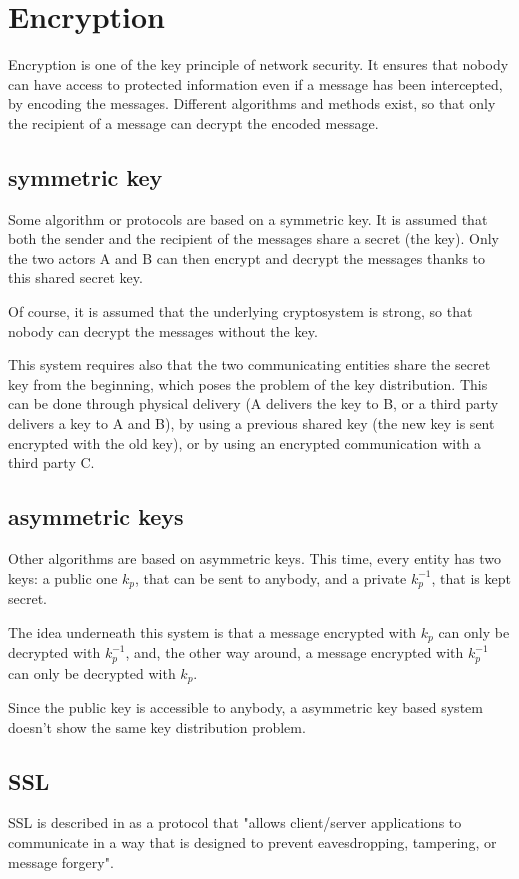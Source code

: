 \section{Encryption}
Encryption is one of the key principle of network security. It ensures that nobody can have access to protected information even if a message has been intercepted, by encoding the messages. Different algorithms and methods exist, so that only the recipient of a message can decrypt the encoded message.

\subsection{symmetric key}
Some algorithm or protocols are based on a symmetric key. It is assumed that both the sender and the recipient of the messages share a secret (the key). Only the two actors A and B can then encrypt and decrypt the messages thanks to this shared secret key.

Of course, it is assumed that the underlying cryptosystem is strong, so that nobody can decrypt the messages without the key.

This system requires also that the two communicating entities share the secret key from the beginning, which poses the problem of the key distribution. This can be done through physical delivery (A delivers the key to B, or a third party delivers a key to A and B), by using a previous shared key (the new key is sent encrypted with the old key), or by using an encrypted communication with a third party C.
 
\subsection{asymmetric keys}
Other algorithms are based on asymmetric keys. This time, every entity has two keys: a public one $k_{p}$, that can be sent to anybody, and a private $ k_{p}^{-1} $, that is kept secret.

The idea underneath this system is that a message encrypted with $k_{p}$ can only be decrypted with $ k_{p}^{-1} $, and, the other way around, a message encrypted with $ k_{p}^{-1} $ can only be decrypted with $k_{p}$.

Since the public key is accessible to anybody, a asymmetric key based system doesn't show the same key distribution problem.

\subsection{SSL}
SSL is described in \cite{freier2011secure} as a protocol that "allows client/server applications to communicate in a way that is designed to prevent eavesdropping, tampering, or message forgery".

